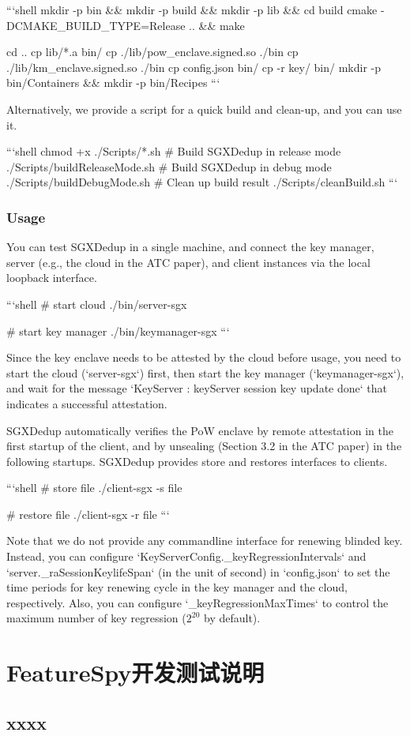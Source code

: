 ```shell
mkdir -p bin \&\& mkdir -p build \&\& mkdir -p lib \&\& cd build
cmake -DCMAKE\_BUILD\_TYPE=Release .. \&\& make

cd ..
cp lib/*.a bin/
cp ./lib/pow\_enclave.signed.so ./bin
cp ./lib/km\_enclave.signed.so ./bin
cp config.json bin/
cp -r key/ bin/
mkdir -p bin/Containers \&\& mkdir -p bin/Recipes
```

Alternatively, we provide a script for a quick build and clean-up, and you can use it.

```shell
chmod +x ./Scripts/*.sh
\# Build SGXDedup in release mode
./Scripts/buildReleaseMode.sh
\# Build SGXDedup in debug mode
./Scripts/buildDebugMode.sh
\# Clean up build result
./Scripts/cleanBuild.sh
```

\subsection{Usage}

You can test SGXDedup in a single machine, and connect the key manager, server (e.g., the cloud in the ATC paper), and client instances via the local loopback interface.

```shell
\# start cloud
./bin/server-sgx

\# start key manager
./bin/keymanager-sgx
```

Since the key enclave  needs to be attested by the cloud before usage, you need to start the cloud (`server-sgx`) first, then start the key manager (`keymanager-sgx`), and wait for the message `KeyServer : keyServer session key update done` that indicates a successful attestation.

SGXDedup automatically verifies the PoW enclave by remote attestation in the first startup of the client, and by unsealing (Section 3.2 in the ATC paper) in the following startups. SGXDedup provides store and restores interfaces to clients.

```shell
\# store file
./client-sgx -s file

\# restore file
./client-sgx -r file
```

Note that we do not provide any commandline interface for renewing blinded key. Instead, you can configure `KeyServerConfig.\_keyRegressionIntervals` and `server.\_raSessionKeylifeSpan` (in the unit of second) in `config.json` to set the time periods for key renewing cycle in the key manager and the cloud, respectively. Also, you can configure `\_keyRegressionMaxTimes` to control the maximum number of key regression ($2^20$ by default).

\chapter{FeatureSpy开发测试说明}
\section{xxxx}